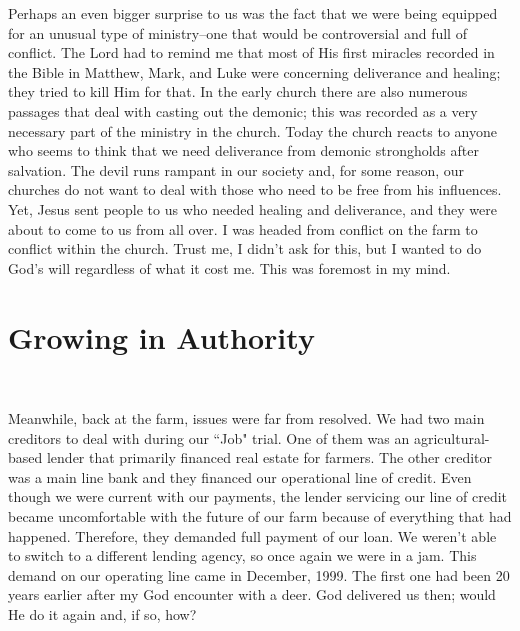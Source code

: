 \documentclass[oneside]{book}
\begin{document}
Perhaps an even bigger surprise to us was the fact that we were being equipped for an unusual type of ministry--one that would be controversial and full of conflict. The Lord had to remind me that most of His first miracles recorded in the Bible in Matthew, Mark, and Luke were concerning deliverance and healing; they tried to kill Him for that. In the early church there are also numerous passages that deal with casting out the demonic; this was recorded as a very necessary part of the ministry in the church. Today the church reacts to anyone who seems to think that we need deliverance from demonic strongholds after salvation. The devil runs rampant in our society and, for some reason, our churches do not want to deal with those who need to be free from his influences. Yet, Jesus sent people to us who needed healing and deliverance, and they were about to come to us from all over. I was headed from conflict on the farm to conflict within the church. Trust me, I didn't ask for this, but I wanted to do God's will regardless of what it cost me. This was foremost in my mind.


\chapter{Growing in Authority}
\

Meanwhile, back at the farm, issues were far from resolved. We had two main creditors to deal with during our ``Job" trial. One of them was an agricultural-based lender that primarily financed real estate for farmers. The other creditor was a main line bank and they financed our operational line of credit. Even though we were current with our payments, the lender servicing our line of credit became uncomfortable with the future of our farm because of everything that had happened. Therefore, they demanded full payment of our loan. We weren't able to switch to a different lending agency, so once again we were in a jam. This demand on our operating line came in December, 1999. The first one had been 20 years earlier after my God encounter with a deer. God delivered us then; would He do it again and, if so, how?
\end{document}
